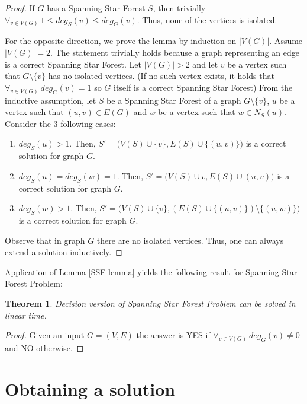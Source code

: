 \documentclass[en]{pracamgr}
\newtheorem{theorem}{Theorem}
\begin{document}
\begin{proof}
	If $G$ has a Spanning Star Forest $S$, then trivially 
	$\forall_{v \in V(G)}\ 1 \leq deg_S(v) \leq deg_G(v)$. Thus, none of the
	vertices is isolated.
	
	For the opposite direction, we prove the lemma by induction on $|V(G)|$.
	Assume ${|V(G)|=2}$. The statement trivially holds because a graph representing
	an edge is a correct Spanning Star Forest. Let $|V(G)| >2$ and let $v$ be 
	a vertex such that $G \setminus \{v\}$ has no isolated vertices. (If no such
	vertex exists, it holds that $\forall_{v \in V(G)}\ deg_G(v)=1$ so $G$ itself
	is a correct Spanning Star Forest) From the inductive assumption, let $S$ be a Spanning Star
	Forest of a graph $G \setminus \{v\}$, $u$ be a vertex such that $(u,v)
	\in E(G)$ and $w$ be a vertex such that $w \in N_S(u)$. Consider the 3
	following cases:
	\begin{enumerate}
		\item $deg_S(u) > 1$. Then, $S'=\big(V(S) \cup \{v\}, E(S) \cup \{(u,v)\}\big)$ is a correct solution for graph $G$.
		\item $deg_S(u) = deg_S(w) = 1$. Then, $S'=\big(V(S) \cup {v}, E(S) \cup
		(u,v)\big)$ is a correct solution for graph $G$.
		\item $deg_S(w) > 1$. Then, $S'=\big(V(S) \cup \{v\}, 
		(E(S) \cup \{(u,v)\}) \setminus \{(u,w)\}\big)$ is a correct solution for graph $G$.
	\end{enumerate}
		Observe that in graph $G$ there are no isolated vertices. Thus, one can
		always extend a solution inductively.
	
\end{proof}
	Application of Lemma \ref{SSF lemma} yields the following result for Spanning
	Star Forest Problem:

\begin{theorem}
	Decision version of Spanning Star Forest Problem can be solved in linear
	time.
\end{theorem}

\begin{proof}
	Given an input $G = (V,E)$ the answer is YES if $\forall_{v \in V(G)}\ 
	deg_G(v) \neq 0$ and NO otherwise.
\end{proof}

\section{Obtaining a solution}
\end{document}
